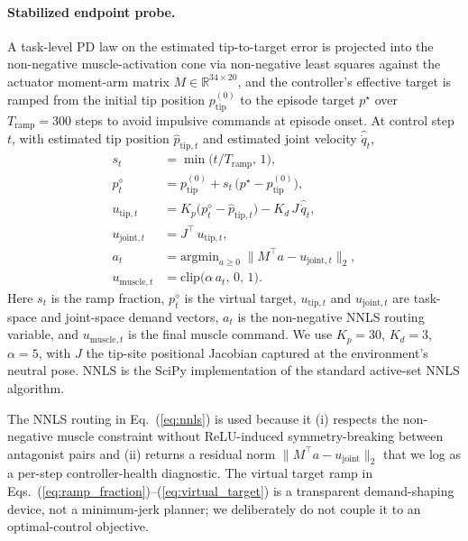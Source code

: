 \documentclass[sn-mathphys,NameDate,iicol]{sn-jnl}
\begin{document}
\paragraph{Stabilized endpoint probe.}
A task-level PD law on the estimated tip-to-target error is projected
into the non-negative muscle-activation cone via non-negative least
squares against the actuator moment-arm matrix
$M\!\in\!\mathbb{R}^{34\times 20}$, and the controller's effective
target is ramped from the initial tip position $p_{\mathrm{tip}}^{(0)}$
to the episode target $p^{\star}$ over
$T_{\mathrm{ramp}}{=}300$ steps to avoid impulsive commands at episode
onset. At control step $t$, with estimated tip position
$\hat p_{\mathrm{tip},t}$ and estimated joint velocity $\hat{\dot q}_t$,
\begin{align}
s_t &= \min\!\bigl(t / T_{\mathrm{ramp}},\,1\bigr),
\label{eq:ramp_fraction}\\
p^{\diamond}_t &= p_{\mathrm{tip}}^{(0)} + s_t\,\bigl(p^{\star} - p_{\mathrm{tip}}^{(0)}\bigr),
\label{eq:virtual_target}\\
u_{\mathrm{tip},t} &= K_{p}\bigl(p^{\diamond}_t - \hat p_{\mathrm{tip},t}\bigr)
 - K_{d}\,J\,\hat{\dot q}_t, \\
u_{\mathrm{joint},t} &= J^{\top}\,u_{\mathrm{tip},t},
\label{eq:stabilized_pd}\\
a_t &= \mathrm{argmin}_{a\geq 0}\;\bigl\lVert M^{\top}a - u_{\mathrm{joint},t}\bigr\rVert_{2}, \label{eq:nnls}\\
u_{\mathrm{muscle},t} &= \mathrm{clip}\!\bigl(\alpha\,a_t,\,0,\,1\bigr).
\label{eq:nnls_clip}
\end{align}
Here $s_t$ is the ramp fraction, $p^{\diamond}_t$ is the virtual target,
$u_{\mathrm{tip},t}$ and $u_{\mathrm{joint},t}$ are task-space and
joint-space demand vectors, $a_t$ is the non-negative NNLS routing
variable, and $u_{\mathrm{muscle},t}$ is the final muscle command. We
use $K_{p}{=}30$, $K_{d}{=}3$, $\alpha{=}5$, with $J$ the tip-site
positional Jacobian captured at the environment's neutral pose. NNLS is the
SciPy implementation of the standard active-set NNLS algorithm.

The NNLS routing in Eq.~(\ref{eq:nnls}) is used because it (i)
respects the non-negative muscle constraint without ReLU-induced
symmetry-breaking between antagonist pairs and (ii) returns a residual
norm $\lVert M^{\top}a - u_{\mathrm{joint}}\rVert_{2}$ that we log as
a per-step controller-health diagnostic. The virtual target ramp
in Eqs.~(\ref{eq:ramp_fraction})--(\ref{eq:virtual_target}) is a
transparent demand-shaping device,
not a minimum-jerk planner; we deliberately do not couple it to an
optimal-control objective.
\end{document}
